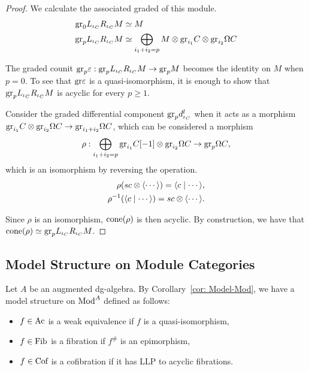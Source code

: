 \documentclass[../thesis.tex]{subfiles}
\begin{document}
\begin{proof}
                We calculate the associated graded of this module.
                \begin{align*}
                    \tt{gr}_0L_{\iota_C}R_{\iota_C}M & \simeq M \\
                    \tt{gr}_pL_{\iota_C}R_{\iota_C}M & \simeq \bigoplus_{i_1 + i_2 = p} M \otimes \tt{gr}_{i_1}C \otimes \tt{gr}_{i_2}\Omega C
                \end{align*}

                The graded counit $\tt{gr}_p\varepsilon : \tt{gr}_pL_{\iota_C}R_{\iota_C}M \rightarrow \tt{gr}_pM$ becomes the identity on $M$ when $p = 0$. To see that $\tt{gr}\varepsilon$ is a quasi-isomorphism, it is enough to show that $\tt{gr}_pL_{\iota_C}R_{\iota_C}M$ is acyclic for every $p \geq 1$.

                Consider the graded differential component $\tt{gr}_pd^l_{\iota_C}$ when it acts as a morphism $\tt{gr}_{i_1}C \otimes \tt{gr}_{i_2}\Omega C \rightarrow \tt{gr}_{i_1+i_2}\Omega C$, which can be considered a morphism 
                \begin{align*}
                    \rho : \bigoplus_{i_1 + i_2 = p} \tt{gr}_{i_1}C[-1] \otimes \tt{gr}_{i_2}\Omega C \rightarrow \tt{gr}_{p}\Omega C\tt{,}
                \end{align*}
                which is an isomorphism by reversing the operation.
                \begin{align*}
                    \rho (sc \otimes \langle \cdots \rangle) = \langle c \mid \cdots \rangle\tt{,} \\
                    \rho^{-1}(\langle c \mid \cdots \rangle) = sc \otimes \langle \cdots \rangle\tt{.}
                \end{align*}

                Since $\rho$ is an isomorphism, $\tt{cone}(\rho)$ is then acyclic. By construction, we have that \\ $\tt{cone}(\rho) \simeq \tt{gr}_pL_{\iota_C}R_{\iota_C}M$.

            \end{proof}

        \subsection{Model Structure on Module Categories}

            Let $A$ be an augmented dg-algebra. By Corollary~\ref{cor: Model-Mod}, we have a model structure on $\tt{Mod}^A$ defined as follows:
            \begin{itemize}
                \item $f\in \tt{Ac}$ is a weak equivalence if $f$ is a quasi-isomorphism,
                \item $f\in \tt{Fib}$ is a fibration if $f^\#$ is an epimorphism,
                \item $f\in \tt{Cof}$ is a cofibration if it has LLP to acyclic fibrations. 
            \end{itemize}
\end{document}
